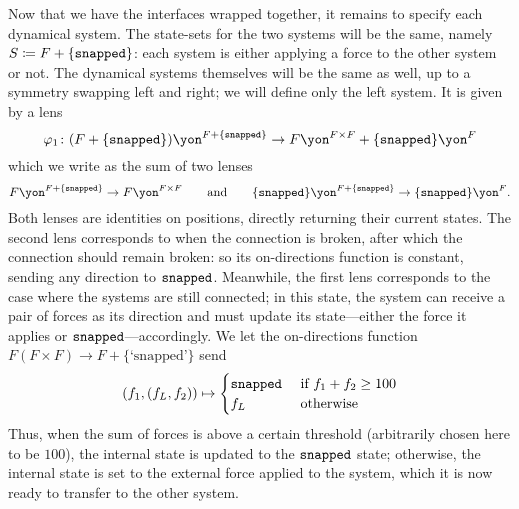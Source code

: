 \documentclass[Book-Poly]{subfiles}
\begin{document}
\begin{example}
Now that we have the interfaces wrapped together, it remains to specify each dynamical system.
The state-sets for the two systems will be the same, namely $S\coloneqq F+\{\texttt{snapped}\}$: each system is either applying a force to the other system or not.
The dynamical systems themselves will be the same as well, up to a symmetry swapping left and right; we will define only the left system.
It is given by a lens
\[\varphi_1\colon (F+\{\const{snapped}\})\yon^{F+\{\const{snapped}\}}\to F\yon^{F\times F}+\{\const{snapped}\}\yon^F\]
which we write as the sum of two lenses
\[F\yon^{F+\{\const{snapped}\}}\to F\yon^{F\times F} \qqand \{\const{snapped}\}\yon^{F+\{\const{snapped}\}}\to\{\const{snapped}\}\yon^F.\]
Both lenses are identities on positions, directly returning their current states.
The second lens corresponds to when the connection is broken, after which the connection should remain broken: so its on-directions function is constant, sending any direction to $\texttt{snapped}$.
Meanwhile, the first lens corresponds to the case where the systems are still connected; in this state, the system can receive a pair of forces as its direction and must update its state---either the force it applies or $\texttt{snapped}$---accordingly.
We let the on-directions function $F(F\times F)\to F+\{\text{`snapped'}\}$ send
\[
(f_1,(f_L,f_2))\mapsto
\begin{cases}
	\texttt{snapped}&\textnormal{ if }f_1+f_2\geq100\\
	f_L&\textnormal{ otherwise}
\end{cases}
\]
Thus, when the sum of forces is above a certain threshold (arbitrarily chosen here to be $100$), the internal state is updated to the $\texttt{snapped}$ state; otherwise, the internal state is set to the external force applied to the system, which it is now ready to transfer to the other system.
\end{example}
\end{document}
